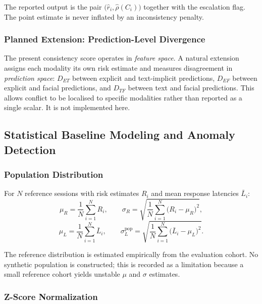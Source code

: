 \documentclass[12pt]{article}
\begin{document}
\noindent The reported output is the pair $\bigl(\hat{r}_i,
\hat{\rho}(C_i)\bigr)$ together with the escalation flag. The point
estimate is never inflated by an inconsistency penalty.

\subsubsection{Planned Extension: Prediction-Level Divergence}
\label{sec:divergence}

The present consistency score operates in \emph{feature space}. A natural
extension assigns each modality its own risk estimate and measures
disagreement in \emph{prediction space}: $D_{ET}$ between explicit and
text-implicit predictions, $D_{EF}$ between explicit and facial
predictions, and $D_{TF}$ between text and facial predictions. This
allows conflict to be localised to specific modalities rather than
reported as a single scalar. It is not implemented here.

\subsection{Statistical Baseline Modeling and Anomaly Detection}
\label{sec:baseline}

\subsubsection{Population Distribution}

For $N$ reference sessions with risk estimates $R_i$ and mean response
latencies $\bar{L}_i$:
\begin{equation}
\mu_R = \frac{1}{N}\sum_{i=1}^{N}R_i,
\qquad
\sigma_R = \sqrt{\frac{1}{N}\sum_{i=1}^{N}\bigl(R_i - \mu_R\bigr)^{2}},
\end{equation}
\begin{equation}
\mu_L = \frac{1}{N}\sum_{i=1}^{N}\bar{L}_i,
\qquad
\sigma^{\text{pop}}_{L}
= \sqrt{\frac{1}{N}\sum_{i=1}^{N}\bigl(\bar{L}_i - \mu_L\bigr)^{2}} .
\end{equation}

\noindent The reference distribution is estimated empirically from the
evaluation cohort. No synthetic population is constructed; this is
recorded as a limitation because a small reference cohort yields
unstable $\mu$ and $\sigma$ estimates.

\subsubsection{Z-Score Normalization}
\end{document}

